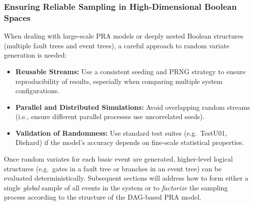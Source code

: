 \subsubsection{Ensuring Reliable Sampling in High-Dimensional Boolean Spaces}
When dealing with large-scale PRA models or deeply nested Boolean structures (multiple fault trees and event trees), a careful approach to random variate generation is needed:
\begin{itemize}
\item \textbf{Reusable Streams:} Use a consistent seeding and PRNG strategy to ensure reproducibility of results, especially when comparing multiple system configurations.
\item \textbf{Parallel and Distributed Simulations:} Avoid overlapping random streams (i.e., ensure different parallel processes use uncorrelated seeds).
\item \textbf{Validation of Randomness:} Use standard test suites (e.g.\ TestU01, Diehard) if the model’s accuracy depends on fine-scale statistical properties.
\end{itemize}
Once random variates for each basic event are generated, higher-level logical structures (e.g.\ gates in a fault tree or branches in an event tree) can be evaluated deterministically.  Subsequent sections will address how to form either a single \emph{global} sample of all events in the system or to \emph{factorize} the sampling process according to the structure of the DAG-based PRA model.